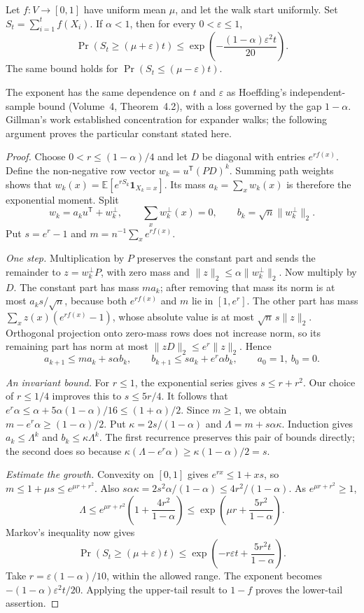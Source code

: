 \begin{theorem}\label{thm:expchernoff}
Let $f:V\to[0,1]$ have uniform mean $\mu$, and let the walk start uniformly. Set $S_t=\sum_{i=1}^tf(X_i)$. If $\alpha<1$, then for every $0<\varepsilon\le1$,
\[
\Pr(S_t\ge(\mu+\varepsilon)t)
\le\exp\left(-\frac{(1-\alpha)\varepsilon^2t}{20}\right).
\]
The same bound holds for $\Pr(S_t\le(\mu-\varepsilon)t)$.
\end{theorem}

The exponent has the same dependence on $t$ and $\varepsilon$ as Hoeffding's independent-sample bound (Volume~4, Theorem~4.2), with a loss governed by the gap $1-\alpha$. Gillman's work established concentration for expander walks; the following argument proves the particular constant stated here.

\begin{proof}
Choose $0<r\le(1-\alpha)/4$ and let $D$ be diagonal with entries $e^{rf(x)}$. Define the non-negative row vector $w_k=u^{\mathsf T}(PD)^k$. Summing path weights shows that $w_k(x)=\mathbb E[e^{rS_k}\mathbf1_{X_k=x}]$. Its mass $a_k=\sum_xw_k(x)$ is therefore the exponential moment. Split
\[
w_k=a_ku^{\mathsf T}+w_k^\perp,\qquad
\sum_xw_k^\perp(x)=0,\qquad b_k=\sqrt n\|w_k^\perp\|_2.
\]
Put $s=e^r-1$ and $m=n^{-1}\sum_xe^{rf(x)}$.

\emph{One step.} Multiplication by $P$ preserves the constant part and sends the remainder to $z=w_k^\perp P$, with zero mass and $\|z\|_2\le\alpha\|w_k^\perp\|_2$. Now multiply by $D$. The constant part has mass $ma_k$; after removing that mass its norm is at most $a_ks/\sqrt n$, because both $e^{rf(x)}$ and $m$ lie in $[1,e^r]$. The other part has mass
$\sum_xz(x)(e^{rf(x)}-1)$,
whose absolute value is at most $\sqrt n\,s\|z\|_2$. Orthogonal projection onto zero-mass rows does not increase norm, so its remaining part has norm at most $\|zD\|_2\le e^r\|z\|_2$. Hence
\[
a_{k+1}\le ma_k+s\alpha b_k,\qquad
b_{k+1}\le sa_k+e^r\alpha b_k,
\qquad a_0=1,\ b_0=0.
\]

\emph{An invariant bound.} For $r\le1$, the exponential series gives $s\le r+r^2$. Our choice of $r\le1/4$ improves this to $s\le5r/4$. It follows that $e^r\alpha\le\alpha+5\alpha(1-\alpha)/16\le(1+\alpha)/2$. Since $m\ge1$, we obtain $m-e^r\alpha\ge(1-\alpha)/2$.
Put $\kappa=2s/(1-\alpha)$ and $\Lambda=m+s\alpha\kappa$. Induction gives $a_k\le\Lambda^k$ and $b_k\le\kappa\Lambda^k$. The first recurrence preserves this pair of bounds directly; the second does so because
$\kappa(\Lambda-e^r\alpha)\ge\kappa(1-\alpha)/2=s$.

\emph{Estimate the growth.} Convexity on $[0,1]$ gives $e^{rx}\le1+xs$, so
$m\le1+\mu s\le e^{\mu r+r^2}$.
Also $s\alpha\kappa=2s^2\alpha/(1-\alpha)\le4r^2/(1-\alpha)$. As $e^{\mu r+r^2}\ge1$,
\[
\Lambda\le e^{\mu r+r^2}\left(1+\frac{4r^2}{1-\alpha}\right)
\le\exp\left(\mu r+\frac{5r^2}{1-\alpha}\right).
\]
Markov's inequality now gives
\[
\Pr(S_t\ge(\mu+\varepsilon)t)
\le\exp\left(-r\varepsilon t+\frac{5r^2t}{1-\alpha}\right).
\]
Take $r=\varepsilon(1-\alpha)/10$, within the allowed range. The exponent becomes $-(1-\alpha)\varepsilon^2t/20$. Applying the upper-tail result to $1-f$ proves the lower-tail assertion.
\end{proof}

